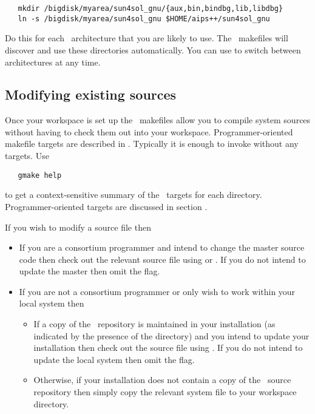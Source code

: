 \begin{verbatim}
   mkdir /bigdisk/myarea/sun4sol_gnu/{aux,bin,bindbg,lib,libdbg}
   ln -s /bigdisk/myarea/sun4sol_gnu $HOME/aips++/sun4sol_gnu
\end{verbatim}

\noindent
Do this for each \aipspp\ architecture that you are likely to use.  The
\aipspp\ makefiles will discover and use these directories automatically.  You
can use  to switch between architectures at any time.

\subsection*{Modifying existing sources}

Once your workspace is set up the \aipspp\ makefiles allow you to compile
system sources without having to check them out into your workspace.
Programmer-oriented makefile targets are described in .  Typically it is enough to invoke  without
any targets.  Use

\begin{verbatim}
   gmake help
\end{verbatim}

\noindent
to get a context-sensitive summary of the \aipspp\ targets for each directory.
Programmer-oriented targets are discussed in section .

If you wish to modify a source file then

\begin{itemize}
\item
   If you are a consortium programmer and intend to change the master source
   code then check out the relevant source file using  or
   .  If you do not intend to update the master then
   omit the  flag.

\item
   If you are not a consortium programmer or only wish to work within your
   local system then
   \begin{itemize}
   \item
      If a copy of the \rcs\ repository is maintained in your installation (as
      indicated by the presence of the  directory) and
      you intend to update your installation then check out the source file
      using .  If you do not intend to update the local system
      then omit the  flag.

   \item
      Otherwise, if your installation does not contain a copy of the \rcs\ 
      source repository then simply copy the relevant system file to your
      workspace directory.
   \end{itemize}
\end{itemize}

